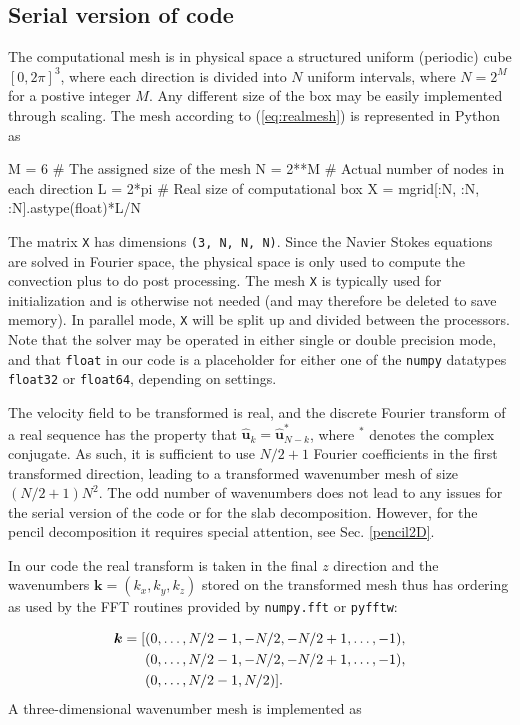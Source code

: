 \documentclass[11pt, oneside]{article}
\newcommand{\inpyth}{\lstinline[style=pythonstyle, basicstyle=\ttfamily]} %[]%
\begin{document}
\subsection{Serial version of code}
The computational mesh is in physical space a structured uniform (periodic) cube $[0, 2\pi]^3$, where each direction is divided into $N$ uniform intervals, where $N=2^M$ for a postive integer $M$. Any different size of the box may be easily implemented through scaling. The mesh according to (\ref{eq:realmesh}) is represented in Python as

\begin{python}
M = 6       # The assigned size of the mesh
N = 2**M    # Actual number of nodes in each direction
L = 2*pi    # Real size of computational box
X = mgrid[:N, :N, :N].astype(float)*L/N
\end{python}
The matrix \inpyth{X} has dimensions \inpyth{(3, N, N, N)}. Since the Navier Stokes equations are solved in Fourier space, the physical space is only used to compute the convection plus to do post processing. The mesh \inpyth{X} is typically used for initialization and is otherwise not needed (and may therefore be deleted to save memory). In parallel mode, \inpyth{X} will be split up and divided between the processors.  Note that the solver may be operated in either single or double precision mode, and that \inpyth{float} in our code is a placeholder for either one of the \inpyth{numpy} datatypes \inpyth{float32} or \inpyth{float64}, depending on settings.

The velocity field to be transformed is real, and the discrete Fourier transform of a real sequence has the property that $\hat{\bm{u}}_k = \hat{\bm{u}}_{N-k}^*$, where $^*$ denotes the complex conjugate. As such, it is sufficient to use $N/2+1$ Fourier coefficients in the first transformed direction, leading to a transformed wavenumber mesh of size $(N/2+1)N^2$. The odd number of wavenumbers does not lead to any issues for the serial version of the code or for the slab decomposition. However, for the pencil decomposition it requires special attention, see Sec. \ref{pencil2D}. 

In our code the real transform is taken in the final $z$ direction and the wavenumbers $\bm{k}=(k_x, k_y, k_z)$ stored on the transformed mesh thus has ordering as used by the FFT routines provided by \texttt{numpy.fft} or \texttt{pyfftw}:

\begin{align}
  \bm{k} = [&(0, \ldots, N/2-1, -N/2, -N/2+1, \ldots, -1), \notag \\
   &(0, \ldots, N/2-1, -N/2, -N/2+1, \ldots, -1),  \notag \\
  &(0, \ldots, N/2-1, N/2)].
\end{align}
A three-dimensional wavenumber mesh is implemented as
\end{document}

